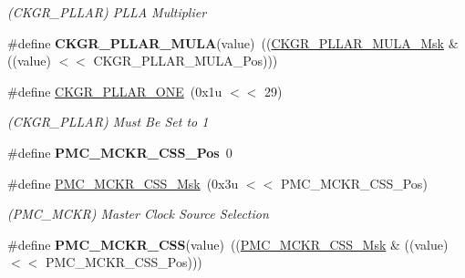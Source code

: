 \begin{DoxyCompactItemize}
\begin{DoxyCompactList}\small\item\em (C\+K\+G\+R\+\_\+\+P\+L\+L\+AR) P\+L\+LA Multiplier \end{DoxyCompactList}\item 
\mbox{\label{group__SAMS70__PMC_ga0784e6083209f155caeea714db658656}} 
\#define {\bfseries C\+K\+G\+R\+\_\+\+P\+L\+L\+A\+R\+\_\+\+M\+U\+LA}(value)~((\mbox{\hyperlink{group__SAMV71__PMC_gac720bcb52bfadc5d76f43d76acce85c7}{C\+K\+G\+R\+\_\+\+P\+L\+L\+A\+R\+\_\+\+M\+U\+L\+A\+\_\+\+Msk}} \& ((value) $<$$<$ C\+K\+G\+R\+\_\+\+P\+L\+L\+A\+R\+\_\+\+M\+U\+L\+A\+\_\+\+Pos)))
\item 
\mbox{\label{group__SAMS70__PMC_gaed80bc1a380b51a350df524311967a3e}} 
\#define \mbox{\hyperlink{group__SAMS70__PMC_gaed80bc1a380b51a350df524311967a3e}{C\+K\+G\+R\+\_\+\+P\+L\+L\+A\+R\+\_\+\+O\+NE}}~(0x1u $<$$<$ 29)
\begin{DoxyCompactList}\small\item\em (C\+K\+G\+R\+\_\+\+P\+L\+L\+AR) Must Be Set to 1 \end{DoxyCompactList}\item 
\mbox{\label{group__SAMS70__PMC_gade7a71e6c8aabb95838f2d0f08f1a4f1}} 
\#define {\bfseries P\+M\+C\+\_\+\+M\+C\+K\+R\+\_\+\+C\+S\+S\+\_\+\+Pos}~0
\item 
\mbox{\label{group__SAMS70__PMC_gaf5490e2702410b788902efcf7fc1876c}} 
\#define \mbox{\hyperlink{group__SAMS70__PMC_gaf5490e2702410b788902efcf7fc1876c}{P\+M\+C\+\_\+\+M\+C\+K\+R\+\_\+\+C\+S\+S\+\_\+\+Msk}}~(0x3u $<$$<$ P\+M\+C\+\_\+\+M\+C\+K\+R\+\_\+\+C\+S\+S\+\_\+\+Pos)
\begin{DoxyCompactList}\small\item\em (P\+M\+C\+\_\+\+M\+C\+KR) Master Clock Source Selection \end{DoxyCompactList}\item 
\mbox{\label{group__SAMS70__PMC_gae0133d836d62b17a81ee91155861817d}} 
\#define {\bfseries P\+M\+C\+\_\+\+M\+C\+K\+R\+\_\+\+C\+SS}(value)~((\mbox{\hyperlink{group__SAMV71__PMC_gaf5490e2702410b788902efcf7fc1876c}{P\+M\+C\+\_\+\+M\+C\+K\+R\+\_\+\+C\+S\+S\+\_\+\+Msk}} \& ((value) $<$$<$ P\+M\+C\+\_\+\+M\+C\+K\+R\+\_\+\+C\+S\+S\+\_\+\+Pos)))

\end{DoxyCompactItemize}
